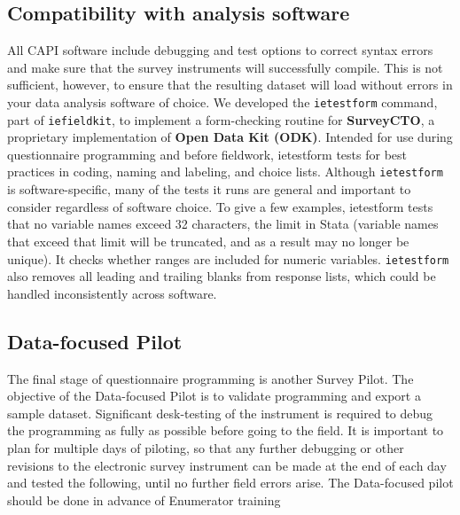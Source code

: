 {\subsection{Compatibility with analysis software}
All CAPI software include debugging and test options to correct syntax errors and make sure that the survey instruments will successfully compile. 
This is not sufficient, however, to ensure that the resulting dataset will load without errors in your data analysis software of choice.
We developed the \texttt{ietestform} command, part of
\texttt{iefieldkit}, to implement a form-checking routine for \textbf{SurveyCTO}, a proprietary implementation of \textbf{Open Data Kit (ODK)}.
Intended for use during questionnaire programming and before fieldwork, ietestform tests for best practices in coding, naming and labeling, and choice lists.
Although \texttt{ietestform} is software-specific, many of the tests it runs are general and important to consider regardless of software choice. 
To give a few examples, ietestform tests that no variable names exceed 32 characters, the limit in Stata (variable names that exceed that limit will be truncated, and as a result may no longer be unique). It checks whether ranges are included for numeric variables. 
\texttt{ietestform} also removes all leading and trailing blanks from response lists, which could be handled inconsistently across software. 

\subsection{Data-focused Pilot}
The final stage of questionnaire programming is another Survey Pilot. 
The objective of the Data-focused Pilot  is to validate programming and export a sample dataset. 
Significant desk-testing of the instrument is required to debug the programming as fully as possible before going to the field. 
It is important to plan for multiple days of piloting, so that any further debugging or other revisions to the electronic survey instrument can be made at the end of each day and tested the following, until no further field errors arise. 
The Data-focused pilot should be done in advance of Enumerator training



}
